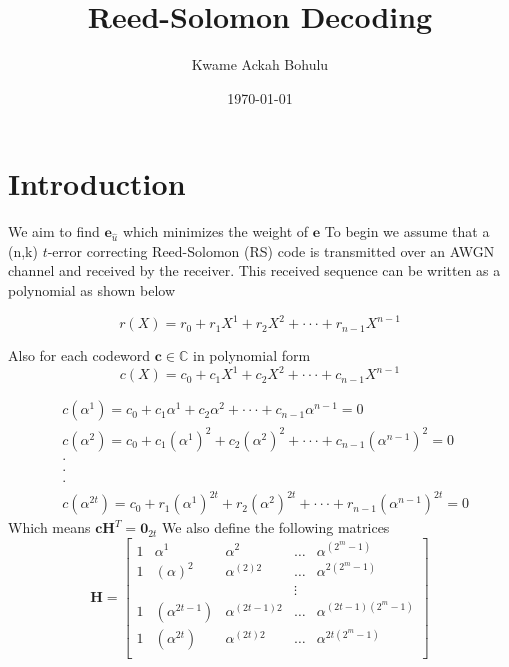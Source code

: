 \documentclass[fontsize=12pt]{article}
\title{Reed-Solomon Decoding}
\author{Kwame Ackah Bohulu}
\date{\today}
\begin{document}
\maketitle

\newpage
\section{Introduction}
We aim to find $\mathbf{e}_{\hat{u}}$ which minimizes the weight of $\mathbf{e}$
To begin we assume that a (n,k) $t$-error correcting Reed-Solomon (RS) code is transmitted
 over an AWGN 
channel and received by the receiver. This received sequence can be written as a polynomial
as shown below

\begin{equation}
r(X)=r_0+r_1X^1+r_2X^2+\cdot\cdot\cdot+r_{n-1}X^{n-1}
\label{1}
\end{equation}

Also for each codeword $\mathbf{c} \in \mathbb{C}$ in polynomial form
\begin{equation}
c(X)=c_0+c_1X^1+c_2X^2+\cdot\cdot\cdot+c_{n-1}X^{n-1}
\end{equation}

\begin{equation}
\begin{split}
&c(\alpha^{1})=c_0+c_1\alpha^1+c_2\alpha^2+\cdot\cdot\cdot+c_{n-1}\alpha^{n-1}=0\\
&c(\alpha^{2})=c_0+c_1(\alpha^1)^2+c_2(\alpha^2)^2+\cdot\cdot\cdot+c_{n-1}(\alpha^{n-1})^2=0\\
&\cdot\\
  &\cdot\\
   &\cdot\\
&c(\alpha^{2t})=c_0+r_1(\alpha^1)^{2t}+r_2(\alpha^2)^{2t}+\cdot\cdot\cdot+r_{n-1}(\alpha^{n-1})^{2t}=0
\end{split}
\label{2}
\end{equation}
Which means $\mathbf{c}\mathbf{H}^T=\mathbf{0}_{2t}$
We also define the following matrices
\begin{equation}
\mathbf{H}=
\begin{bmatrix}
    1       &  \alpha^{1}  &  \alpha^{2}  & \dots &  \alpha^{(2^m-1)}  \\
    1      &  ( \alpha )^2 &   \alpha^{(2)2}  & \dots &  \alpha^{2(2^m-1)}  \\
    &&&\vdots{} \\
    1       &  (\alpha^{2t-1}) & \alpha^{(2t-1)2}  & \dots &  \alpha^{(2t-1)(2^m-1)}  \\
    1       &  ( \alpha^{2t} ) &  \alpha^{(2t)2}  & \dots &  \alpha^{2t(2^m-1)}  \\
\end{bmatrix}
\end{equation}
\end{document}
